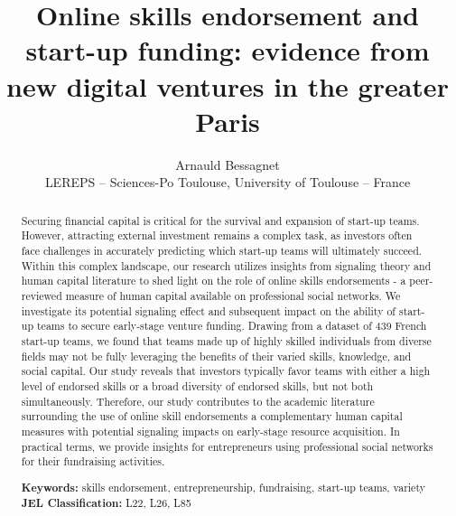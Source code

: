 \documentclass[12pt]{article}
\begin{document}
\title{Online skills endorsement and start-up funding: evidence from new digital ventures in the greater Paris}
\date{\vspace{-3ex}}
\author{Arnauld Bessagnet \\ \footnotesize{LEREPS – Sciences-Po Toulouse, University of Toulouse – France} \\}

\maketitle \vspace{-1,5em}

\begin{abstract}
\footnotesize
Securing financial capital is critical for the survival and expansion of start-up teams. However, attracting external investment remains a complex task, as investors often face challenges in accurately predicting which start-up teams will ultimately succeed. Within this complex landscape, our research utilizes insights from signaling theory and human capital literature to shed light on the role of online skills endorsements - a peer-reviewed measure of human capital available on professional social networks. We investigate its potential signaling effect and subsequent impact on the ability of start-up teams to secure early-stage venture funding. Drawing from a dataset of 439 French start-up teams, we found that teams made up of highly skilled individuals from diverse fields may not be fully leveraging the benefits of their varied skills, knowledge, and social capital. Our study reveals that investors typically favor teams with either a high level of endorsed skills or a broad diversity of endorsed skills, but not both simultaneously. Therefore, our study contributes to the academic literature surrounding the use of online skill endorsements a complementary human capital measures with potential signaling impacts on early-stage resource acquisition. In practical terms, we provide insights for entrepreneurs using professional social networks for their fundraising activities. \newline

\begin{obeylines}
\noindent \footnotesize{}{\textbf{Keywords:} skills endorsement, entrepreneurship, fundraising, start-up teams, variety}
\noindent \footnotesize{\textbf{JEL Classification:} L22, L26, L85}
\end{obeylines}

\end{abstract}
\end{document}
